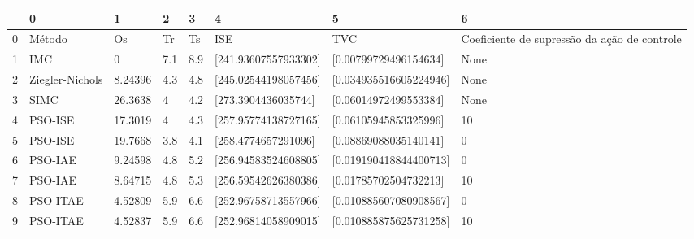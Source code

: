 \begin{tabular}{llllllll}
\toprule
{} &                0 &        1 &    2 &    3 &                     4 &                       5 &                                             6 \\
\midrule
0 &           Método &       Os &   Tr &   Ts &                   ISE &                     TVC &  Coeficiente de supressão da ação de controle \\
1 &              IMC &        0 &  7.1 &  8.9 &  [241.93607557933302] &   [0.00799729496154634] &                                          None \\
2 &  Ziegler-Nichols &  8.24396 &  4.3 &  4.8 &  [245.02544198057456] &  [0.034935516605224946] &                                          None \\
3 &             SIMC &  26.3638 &    4 &  4.2 &   [273.3904436035744] &   [0.06014972499553384] &                                          None \\
4 &          PSO-ISE &  17.3019 &    4 &  4.3 &  [257.95774138727165] &   [0.06105945853325996] &                                            10 \\
5 &          PSO-ISE &  19.7668 &  3.8 &  4.1 &   [258.4774657291096] &   [0.08869088035140141] &                                             0 \\
6 &          PSO-IAE &  9.24598 &  4.8 &  5.2 &  [256.94583524608805] &  [0.019190418844400713] &                                             0 \\
7 &          PSO-IAE &  8.64715 &  4.8 &  5.3 &  [256.59542626380386] &   [0.01785702504732213] &                                            10 \\
8 &         PSO-ITAE &  4.52809 &  5.9 &  6.6 &  [252.96758713557966] &  [0.010885607080908567] &                                             0 \\
9 &         PSO-ITAE &  4.52837 &  5.9 &  6.6 &  [252.96814058909015] &  [0.010885875625731258] &                                            10 \\
\bottomrule
\end{tabular}
